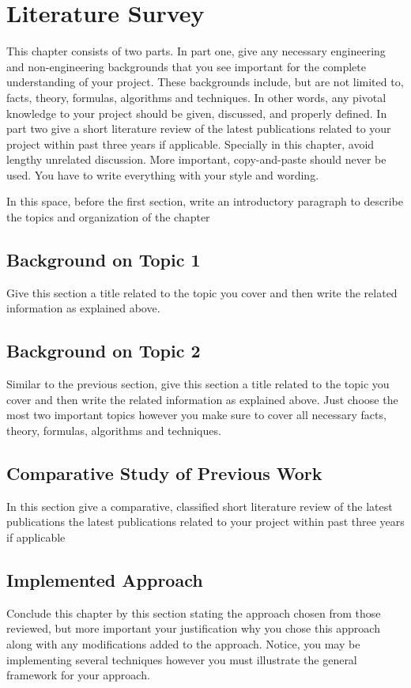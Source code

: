\section{Literature Survey}

This chapter consists of two parts.  In part one, give any necessary engineering and non-engineering backgrounds that you see important for the complete understanding of your project. These backgrounds include, but are not limited to, facts, theory, formulas, algorithms and techniques. In other words, any pivotal knowledge to your project should be given, discussed, and properly defined. In part two give a short literature review of the latest publications related to your project within past three years if applicable.  Specially in this chapter, avoid lengthy unrelated discussion. More important, copy-and-paste should never be used. You have to write everything with your style and wording.

In this space, before the first section, write an introductory paragraph to describe the topics and organization of the chapter

\subsection{Background on Topic 1}
Give this section a title related to the topic you cover and  then write the related information as explained above. 

\subsection{Background on Topic 2}
Similar to the previous section, give this section a title related to the topic you cover and  then write the related information as explained above. 
Just choose the most two important topics however you make sure to cover all necessary facts, theory, formulas, algorithms and techniques.

\subsection{Comparative Study of Previous Work}
In this section give a comparative, classified  short literature review of the latest publications the latest publications related to your project within past three years if applicable

\subsection{Implemented Approach}
Conclude this chapter by this section stating the approach chosen from those reviewed, but more important your justification why you chose this approach along with any modifications added to the approach.
Notice, you may be implementing several techniques however you must illustrate the general framework for your approach.
